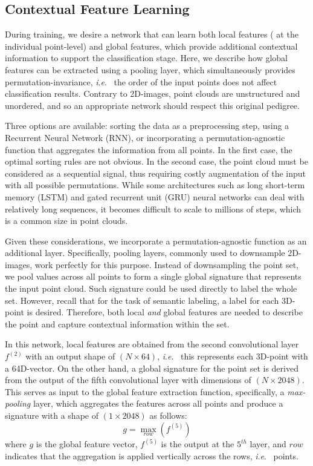 \documentclass[final,3p,times,twocolumn,authoryear]{elsarticle}
\newcommand{\ie}{\textit{i}.\textit{e}.}
\begin{document}
\subsection{Contextual Feature Learning}
\label{sec:contextual_feature_learning}
During training, we desire a network that can learn both local features ( at the individual point-level) and global features, which provide additional contextual information to support the classification stage. 
Here, we describe how global features can be extracted using a pooling layer, which simultaneously provides permutation-invariance, \ie~ the order of the input points does not affect classification results. 
Contrary to 2D-images, point clouds are unstructured and unordered, and so an appropriate network should respect this original pedigree. 

Three options are available: sorting the data as a preprocessing step, using a Recurrent Neural Network (RNN), or incorporating a permutation-agnostic function that aggregates the information from all points. 
In the first case, the optimal sorting rules are not obvious.
In the second case, the point cloud must be considered as a sequential signal, thus requiring costly augmentation of the input with all possible permutations. 
While some architectures such as long short-term memory (LSTM) and gated recurrent unit (GRU) neural networks can deal with relatively long sequences, it becomes difficult to scale to millions of steps, which is a common size in point clouds. 

Given these considerations, we incorporate a permutation-agnostic function as an additional layer.
Specifically, pooling layers, commonly used to downsample 2D-images, work perfectly for this purpose. 
Instead of downsampling the point set, we pool values across all points to form a single global signature that represents the input point cloud. 
Such signature could be used directly to label the whole set. 
However, recall that for the task of semantic labeling, a label for each 3D-point is desired. 
Therefore, both local \emph{and} global features are needed to describe the point  and capture contextual information within the set. 

In this network, local features are obtained from the second convolutional layer $f^{(2)}$ with an output shape of $(N\times64)$, \ie~ this represents each 3D-point with a 64D-vector. 
On the other hand, a global signature for the point set is derived from the output of the fifth convolutional layer with dimensions of $(N\times2048)$.
This serves as input to the global feature extraction function, specifically, a {\it max-pooling} layer, which aggregates the features across all points and produce a signature with a shape of $(1\times2048)$ as follows:
\begin{equation}
\label{eq:5}
g = \max_{row}(f^{(5)})
\end{equation}
where $g$ is the global feature vector, $f^{(5)}$ is the output at the $5^{th}$ layer, and $row$ indicates that the aggregation is applied vertically across the rows, \ie~ points. 
\end{document}
